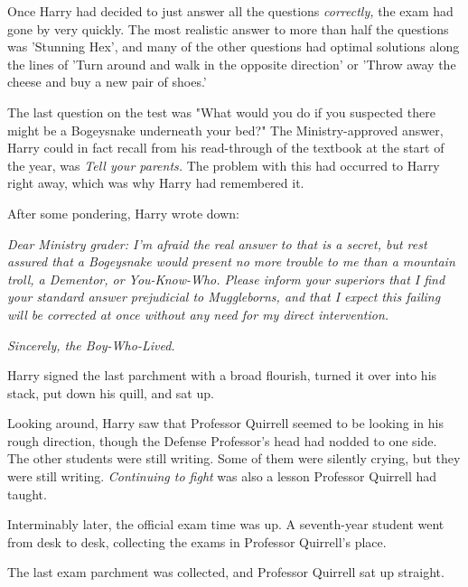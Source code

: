 Once Harry had decided to just answer all the questions \emph{correctly,} the 
exam had gone by very quickly. The most realistic answer to more than half the 
questions was 'Stunning Hex', and many of the other questions had optimal 
solutions along the lines of 'Turn around and walk in the opposite direction' 
or 'Throw away the cheese and buy a new pair of shoes.'

The last question on the test was "What would you do if you suspected there 
might be a Bogeysnake underneath your bed?" The Ministry-approved answer, Harry 
could in fact recall from his read-through of the textbook at the start of the 
year, was \emph{Tell your parents.} The problem with this had occurred to Harry 
right away, which was why Harry had remembered it.

After some pondering, Harry wrote down:

\emph{Dear Ministry grader: I'm afraid the real answer to that is a secret, but 
rest assured that a Bogeysnake would present no more trouble to me than a 
mountain troll, a Dementor, or You-Know-Who. Please inform your superiors that 
I find your standard answer prejudicial to Muggleborns, and that I expect this 
failing will be corrected at once without any need for my direct intervention.}

\emph{Sincerely, the Boy-Who-Lived.}

Harry signed the last parchment with a broad flourish, turned it over into his 
stack, put down his quill, and sat up.

Looking around, Harry saw that Professor Quirrell seemed to be looking in his 
rough direction, though the Defense Professor's head had nodded to one side. 
The other students were still writing. Some of them were silently crying, but 
they were still writing. \emph{Continuing to fight} was also a lesson Professor 
Quirrell had taught.

Interminably later, the official exam time was up. A seventh-year student went 
from desk to desk, collecting the exams in Professor Quirrell's place.

The last exam parchment was collected, and Professor Quirrell sat up straight.

